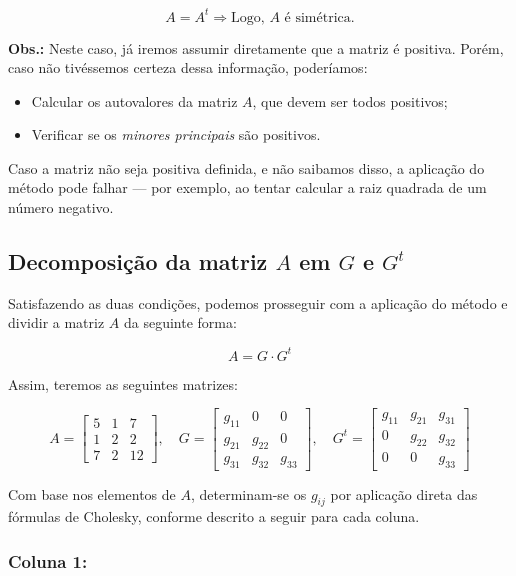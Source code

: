 \documentclass[12pt,a4paper]{article}
\begin{document}
\[
A = A^t \Rightarrow \text{Logo, } A \text{ é simétrica.}
\]

\vspace{0.2cm}
\noindent
\textbf{Obs.:} Neste caso, já iremos assumir diretamente que a matriz é positiva. Porém, caso não tivéssemos certeza dessa informação, poderíamos:

\begin{itemize}
    \item Calcular os autovalores da matriz $A$, que devem ser todos positivos;
    \item Verificar se os \textit{minores principais} são positivos.
\end{itemize}

Caso a matriz não seja positiva definida, e não saibamos disso, a aplicação do método pode falhar — por exemplo, ao tentar calcular a raiz quadrada de um número negativo.

\subsection{Decomposição da matriz $A$ em $G$ e $G^t$}

Satisfazendo as duas condições, podemos prosseguir com a aplicação do método e dividir a matriz $A$ da seguinte forma:

\[
A = G \cdot G^t
\]

Assim, teremos as seguintes matrizes:

\[
A = \begin{bmatrix}
5 & 1 & 7 \\
1 & 2 & 2 \\
7 & 2 & 12
\end{bmatrix},
\quad
G = \begin{bmatrix}
g_{11} & 0 & 0 \\
g_{21} & g_{22} & 0 \\
g_{31} & g_{32} & g_{33}
\end{bmatrix},
\quad
G^t = \begin{bmatrix}
g_{11} & g_{21} & g_{31} \\
0 & g_{22} & g_{32} \\
0 & 0 & g_{33}
\end{bmatrix}
\]

\vspace{0.3cm}
Com base nos elementos de $A$, determinam-se os $g_{ij}$ por aplicação direta das fórmulas de Cholesky, conforme descrito a seguir para cada coluna.

\subsubsection{Coluna 1:}
\end{document}
